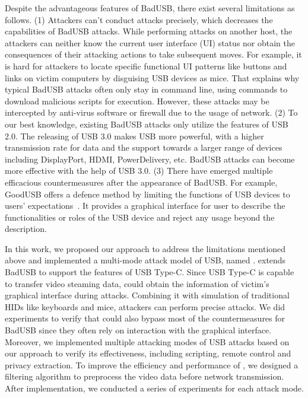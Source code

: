 Despite the advantageous features of BadUSB, there exist several limitations as follows.
(1) Attackers can't conduct attacks precisely, which decreases the capabilities of BadUSB attacks.
While performing attacks on another host, the attackers can neither know the current user interface (UI) status nor obtain the consequences of their attacking actions to take subsequent moves.
For example, it is hard for attackers to locate specific functional UI patterns like buttons and links on victim computers by disguising USB devices as mice.
That explains why typical BadUSB attacks often only stay in command line, using commands to download malicious scripts for execution.
However, these attacks may be intercepted by anti-virus software or firewall due to the usage of network.
(2) To our best knowledge, existing BadUSB attacks only utilize the features of USB 2.0.
The releasing of USB 3.0 makes USB more powerful, with a higher transmission rate for data and the support towards a larger range of devices including DisplayPort, HDMI, PowerDelivery, etc.
BadUSB attacks can become more effective with the help of USB 3.0.
(3) There have emerged multiple efficacious countermeasures after the appearance of BadUSB.
For example, GoodUSB offers a defence method by limiting the functions of USB devices to users' expectations~\cite{tian2015defending}.
It provides a graphical interface for user to describe the functionalities or roles of the USB device and reject any usage beyond the description.

In this work, we proposed our approach to address the limitations mentioned above and implemented a multi-mode attack model of USB, named \tool.
\tool extends BadUSB to support the features of USB Type-C.
Since USB Type-C is capable to transfer video steaming data, \tool could obtain the information of victim's graphical interface during attacks.
Combining it with simulation of traditional HIDs like keyboards and mice, attackers can perform precise attacks.
We did experiments to verify that \tool could also bypass most of the countermeasures for BadUSB since they often rely on interaction with the graphical interface.
Moreover, we implemented multiple attacking modes of USB attacks based on our approach to verify its effectiveness, including scripting, remote control and privacy extraction.
To improve the efficiency and performance of \tool, we designed a filtering algorithm to preprocess the video data before network transmission.
After implementation, we conducted a series of experiments for each attack mode.

